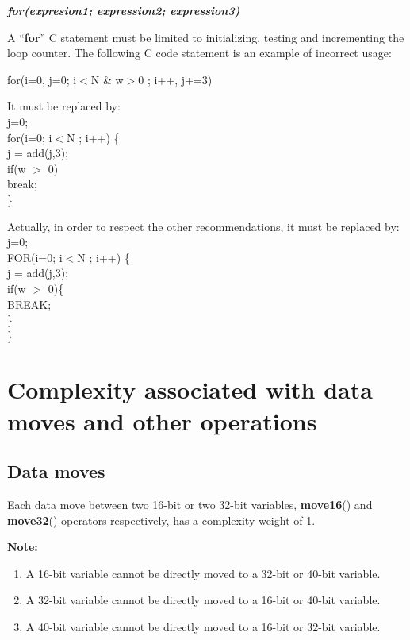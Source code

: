\textbf{\emph{for(expresion1; expression2; expression3)}}

A ``\textbf{for}'' C statement must be limited to initializing,
testing and incrementing the loop counter. The following C code
statement is an example of incorrect usage:

for(i=0, j=0; i$<$N \& w$>$0 ; i++, j+=3)

It must be replaced by: \\
j=0;\\
for(i=0; i$<$N ; i++) \{\\
j = add(j,3);\\
if(w $>$ 0)\\
break; \\
\}

Actually, in order to respect the other recommendations, it must
be replaced by: \\
j=0;\\
FOR(i=0; i$<$N ; i++) \{\\
j = add(j,3);\\
if(w $>$ 0)\{\\
BREAK; \\
\}\\
\}


\section{Complexity associated with data moves and other operations}

\subsection{Data moves}

Each data move between two 16-bit or two 32-bit variables, \textbf{move16}() and \textbf{move32}() operators respectively, has a complexity weight of 1.

\textbf{Note:} \hfill {}

\begin{enumerate}{}{}
    \item A 16-bit variable cannot be directly moved to a 32-bit or 40-bit variable.
    \item A 32-bit variable cannot be directly moved to a 16-bit or 40-bit variable.
    \item A 40-bit variable cannot be directly moved to a 16-bit or 32-bit variable.
\end{enumerate}

